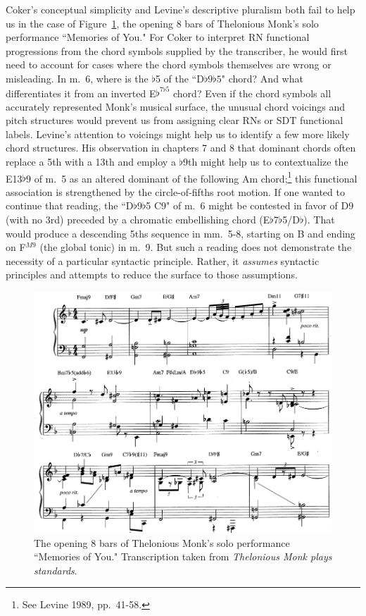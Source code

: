Coker's conceptual simplicity and Levine's descriptive pluralism both fail to help us in the case of Figure~\ref{monk}, the opening 8 bars of Thelonious Monk's solo performance ``Memories of You."  For Coker to interpret RN functional progressions from the chord symbols supplied by the transcriber, he would first need to account for cases where the chord symbols themselves are wrong or misleading.  In m.\ 6, where is the $\flat$5 of the ``D$\flat 9\flat 5$" chord?  And what differentiates it from an inverted E$\flat^{7\flat 5}$ chord?  Even if the chord symbols all accurately represented Monk's musical surface, the unusual chord voicings and pitch structures would prevent us from assigning clear RNs or SDT functional labels.  Levine's attention to voicings might help us to identify a few more likely chord structures.  His observation in chapters 7 and 8 that dominant chords often replace a 5th with a 13th and employ a $\flat$9th might help us to contextualize the E13$\flat$9 of m.\ 5 as an altered dominant of the following Am chord;\footnote{See Levine 1989, pp.\ 41-58.} this functional association is strengthened by the circle-of-fifths root motion.  If one wanted to continue that reading, the ``D$\flat$9$\flat$5 C9" of m.\ 6 might be contested in favor of D9 (with no 3rd) preceded by a chromatic embellishing chord (E$\flat$7$\flat$5/D$\flat$). That would produce a descending 5ths sequence in mm.\ 5-8, starting on B and ending on F$^{M9}$ (the global tonic) in m.\ 9.   But such a reading does not demonstrate the necessity of a particular syntactic principle.  Rather, it \emph{assumes} syntactic principles and attempts to reduce the surface to those assumptions.
\begin{figure}
	\centering
	\caption{The opening 8 bars of Thelonious Monk's solo performance ``Memories of You."  Transcription taken from \emph{Thelonious Monk plays standards}.}
	\label{monk}
	\includegraphics[width=6in]{diss_prospectus_monk.png}
\end{figure}

